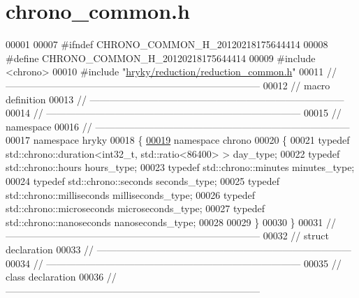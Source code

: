 \hypertarget{chrono__common_8h_source}{\section{chrono\-\_\-common.\-h}
}

\begin{DoxyCode}
00001 
00007 \textcolor{preprocessor}{#ifndef CHRONO\_COMMON\_H\_20120218175644414}
00008 \textcolor{preprocessor}{}\textcolor{preprocessor}{#define CHRONO\_COMMON\_H\_20120218175644414}
00009 \textcolor{preprocessor}{}\textcolor{preprocessor}{#include <chrono>}
00010 \textcolor{preprocessor}{#include "\hyperlink{reduction__common_8h}{hryky/reduction/reduction_common.h}"}
00011 \textcolor{comment}{//
      ------------------------------------------------------------------------------}
00012 \textcolor{comment}{// macro definition}
00013 \textcolor{comment}{//
      ------------------------------------------------------------------------------}
00014 \textcolor{comment}{//
      ------------------------------------------------------------------------------}
00015 \textcolor{comment}{// namespace}
00016 \textcolor{comment}{//
      ------------------------------------------------------------------------------}
00017 \textcolor{keyword}{namespace }hryky
00018 \{
\hypertarget{chrono__common_8h_source_l00019}{}\hyperlink{namespacehryky_1_1chrono}{00019} \textcolor{keyword}{namespace }chrono
00020 \{
00021     \textcolor{keyword}{typedef} std::chrono::duration<int32\_t, std::ratio<86400> > day\_type;
00022     \textcolor{keyword}{typedef} std::chrono::hours hours\_type;
00023     \textcolor{keyword}{typedef} std::chrono::minutes minutes\_type;
00024     \textcolor{keyword}{typedef} std::chrono::seconds seconds\_type;
00025     \textcolor{keyword}{typedef} std::chrono::milliseconds milliseconds\_type;
00026     \textcolor{keyword}{typedef} std::chrono::microseconds  microseconds\_type;
00027     \textcolor{keyword}{typedef} std::chrono::nanoseconds nanoseconds\_type;
00028 
00029 \}
00030 \}
00031 \textcolor{comment}{//
      ------------------------------------------------------------------------------}
00032 \textcolor{comment}{// struct declaration}
00033 \textcolor{comment}{//
      ------------------------------------------------------------------------------}
00034 \textcolor{comment}{//
      ------------------------------------------------------------------------------}
00035 \textcolor{comment}{// class declaration}
00036 \textcolor{comment}{//
      ------------------------------------------------------------------------------}

\end{DoxyCode}
